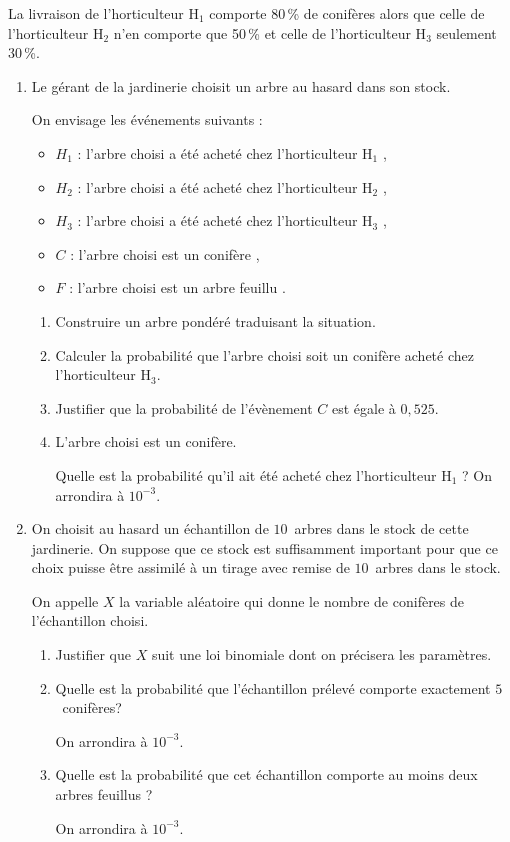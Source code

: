 \documentclass[10pt]{article}
\begin{document}
La livraison de l'horticulteur H$_{1}$ comporte 80\,\% de conifères alors que celle de l'horticulteur H$_{2}$ n'en comporte que 50\,\% et celle de l'horticulteur H$_{3}$ seulement 30\,\%.

\medskip
 
\begin{enumerate}
\item Le gérant de la jardinerie choisit un arbre au hasard dans son stock. 

On envisage les événements suivants :

\setlength\parindent{6mm} 
\begin{itemize}
\item $H_{1}$ : \og l'arbre choisi a été acheté chez l'horticulteur H$_{1}$ \fg, 
\item $H_{2}$ : \og l'arbre choisi a été acheté chez l'horticulteur H$_{2}$ \fg, 
\item $H_{3}$ : \og l'arbre choisi a été acheté chez l'horticulteur H$_{3}$ \fg, 
\item $C$ : \og l'arbre choisi est un conifère \fg, 
\item $F$ : \og l'arbre choisi est un arbre feuillu \fg.
\end{itemize}
\setlength\parindent{0mm} 

\medskip
 
	\begin{enumerate}
		\item Construire un arbre pondéré traduisant la situation. 
		\item Calculer la probabilité que l'arbre choisi soit un conifère acheté chez l'horticulteur H$_{3}$. 
		\item Justifier que la probabilité de l'évènement $C$ est égale à $0,525$. 
		\item L'arbre choisi est un conifère.
		 
Quelle est la probabilité qu'il ait été acheté chez l'horticulteur H$_1$ ? On arrondira à $10^{-3}$.
	\end{enumerate}	 
\item On choisit au hasard un échantillon de $10$~arbres dans le stock de cette jardinerie. On suppose que ce stock est suffisamment important pour que ce choix puisse être assimilé à un tirage avec remise de $10$~arbres dans le stock.
 
On appelle $X$ la variable aléatoire qui donne le nombre de conifères de l'échantillon choisi. 
	\begin{enumerate}
		\item Justifier que $X$ suit une loi binomiale dont on précisera les paramètres. 
		\item Quelle est la probabilité que l'échantillon prélevé comporte exactement $5$~conifères? 

On arrondira à $10^{-3}$. 
		\item Quelle est la probabilité que cet échantillon comporte au moins deux arbres feuillus ?
		 
On arrondira à $10^{-3}$.
	\end{enumerate} 
\end{enumerate}
\end{document}

